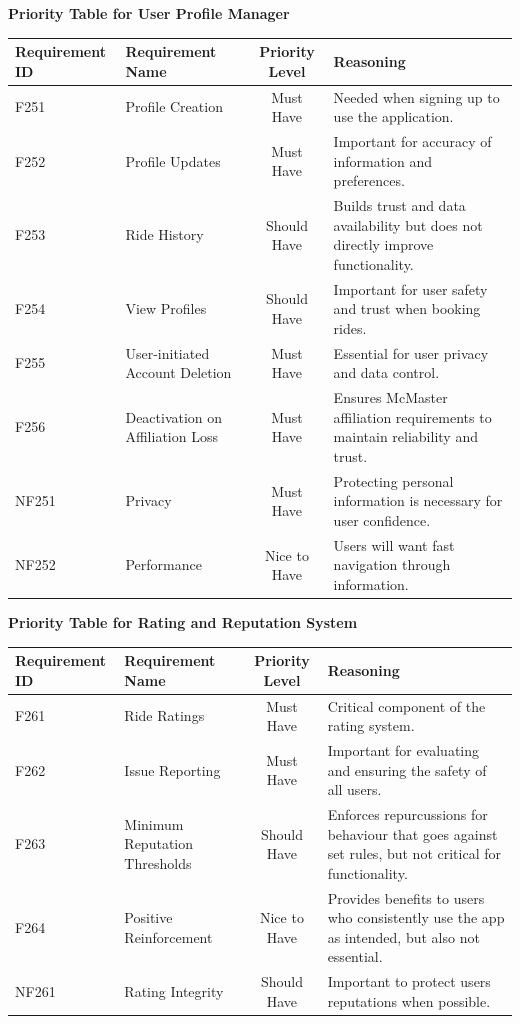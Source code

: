 \documentclass[12pt,letterpaper]{article}
\begin{document}
  \noindent \textbf{Priority Table for User Profile Manager}
  \vspace{0.5em}
  \begin{center}
  \small
  \begin{tabularx}{\textwidth}{|l|X|c|Y|}
  \hline
  \textbf{Requirement ID} & \textbf{Requirement Name} & \textbf{Priority Level} & \textbf{Reasoning} \\ \hline
  F251 & Profile Creation & Must Have & Needed when signing up to use the application. \\ \hline
  F252 & Profile Updates & Must Have & Important for accuracy of information and preferences. \\ \hline
  F253 & Ride History & Should Have & Builds trust and data availability but does not directly improve functionality. \\ \hline
  F254 & View Profiles & Should Have & Important for user safety and trust when booking rides. \\ \hline
  F255 & User-initiated Account Deletion & Must Have & Essential for user privacy and data control. \\ \hline
  F256 & Deactivation on Affiliation Loss & Must Have & Ensures McMaster affiliation requirements to maintain reliability and trust.\\ \hline
  NF251 & Privacy & Must Have & Protecting personal information is necessary for user confidence. \\ \hline
  NF252 & Performance & Nice to Have & Users will want fast navigation through information. \\ \hline
  \end{tabularx}
\end{center}
  \vspace{2em}
  \noindent \textbf{Priority Table for Rating and Reputation System}
  \vspace{0.5em}
  \begin{center}
  \small
  \begin{tabularx}{\textwidth}{|l|X|c|Y|}
  \hline 
  \textbf{Requirement ID} & \textbf{Requirement Name} & \textbf{Priority Level} & \textbf{Reasoning} \\ \hline
  F261 & Ride Ratings & Must Have & Critical component of the rating system. \\ \hline
  F262 & Issue Reporting & Must Have & Important for evaluating and ensuring the safety of all users. \\ \hline
  F263 & Minimum Reputation Thresholds & Should Have & Enforces repurcussions for behaviour that goes against set rules, but not critical for functionality. \\ \hline
  F264 & Positive Reinforcement & Nice to Have & Provides benefits to users who consistently use the app as intended, but also not essential. \\ \hline
  NF261 & Rating Integrity & Should Have & Important to protect users reputations when possible. \\ \hline
  \end{tabularx}
\end{center}
\end{document}
